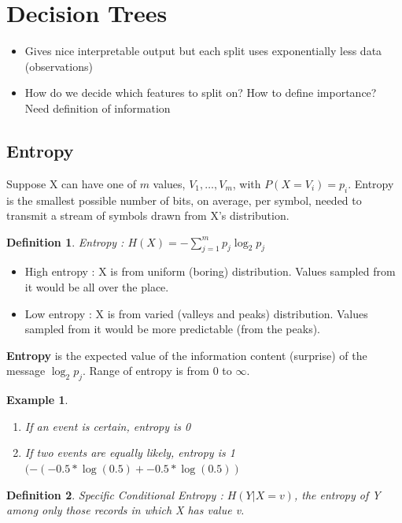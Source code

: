 \documentclass[a4paper]{article}\usepackage[]{graphicx}\usepackage[]{color}
\newtheorem{defn}{Definition}[section]
\newtheorem{ex}{Example}[section]
\begin{document}
\section{Decision Trees}

\begin{itemize}
\item Gives nice interpretable output but each split uses exponentially less data (observations)
\item How do we decide which features to split on? How to define importance? Need definition of information
\end{itemize}

\subsection{Entropy}
Suppose X can have one of $m$ values, $V_1,\ldots,V_m$, with $P(X=V_i)=p_i$. Entropy is the smallest possible number of bits, on average, per symbol, needed to transmit a stream of symbols drawn from X's distribution. 

\begin{defn}
Entropy : $H(X) = -\sum_{j=1}^m p_j \log_2 p_j$
\end{defn}

\begin{itemize}
\item High entropy : X is from uniform (boring) distribution. Values sampled from it would be all over the place.
\item Low entropy : X is from varied (valleys and peaks) distribution. Values sampled from it would be more predictable (from the peaks).
\end{itemize}

\textbf{Entropy} is the expected value of the information content (surprise) of the message $\log_2 p_j$. Range of entropy is from 0 to $\infty$. 

\begin{ex}
\begin{enumerate}
\item If an event is certain, entropy is 0
\item If two events are equally likely, entropy is 1 $(-\left(-0.5 * \log(0.5) + -0.5 * \log(0.5)\right)$
\end{enumerate}
\end{ex}

\begin{defn}
Specific Conditional Entropy : $H(Y|X=v)$, the entropy of Y among only those records in which X has value v.
\end{defn}
\end{document}
